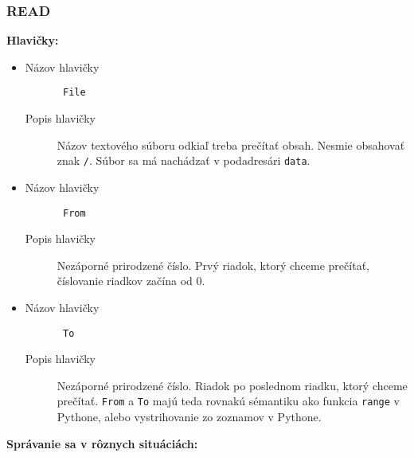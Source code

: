 \subsubsection{ READ }
\noindent\textbf{Hlavičky:}
\begin{itemize}
\item
\begin{description}
\item[Názov hlavičky]\texttt{ File }
\item[Popis hlavičky] Názov textového súboru odkiaľ treba prečítať obsah. Nesmie obsahovať znak \texttt{/}. Súbor sa má nachádzať v podadresári \texttt{data}. 
\end{description}
\item
\begin{description}
\item[Názov hlavičky]\texttt{ From }
\item[Popis hlavičky] Nezáporné prirodzené číslo. Prvý riadok, ktorý chceme prečítať, číslovanie riadkov začína od 0. 
\end{description}
\item
\begin{description}
\item[Názov hlavičky]\texttt{ To }
\item[Popis hlavičky] Nezáporné prirodzené číslo. Riadok po poslednom riadku, ktorý chceme prečítať. \texttt{From} a \texttt{To} majú teda rovnakú sémantiku ako funkcia \texttt{range} v Pythone, alebo vystrihovanie zo zoznamov v Pythone. 
\end{description}
\end{itemize}
\noindent\textbf{Správanie sa v rôznych situáciách:}
